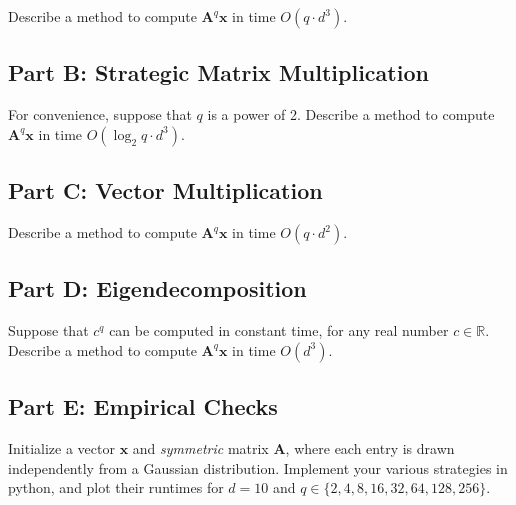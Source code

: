 \documentclass{article}
\begin{document}
Describe a method to compute $\mathbf{A}^q \mathbf{x}$ in time $O(q \cdot d^3)$.

\subsection*{Part B: Strategic Matrix Multiplication}

For convenience, suppose that $q$ is a power of 2.
Describe a method to compute $\mathbf{A}^q \mathbf{x}$ in time $O(\log_2 q \cdot d^3)$.

\subsection*{Part C: Vector Multiplication}

Describe a method to compute $\mathbf{A}^q \mathbf{x}$ in time $O(q \cdot d^2)$.

\subsection*{Part D: Eigendecomposition}

Suppose that $c^q$ can be computed in constant time, for any real number $c \in \mathbb{R}$.
Describe a method to compute $\mathbf{A}^q \mathbf{x}$ in time $O(d^3)$.

\subsection*{Part E: Empirical Checks}

Initialize a vector $\mathbf{x}$ and \textit{symmetric} matrix $\mathbf{A}$, where each entry is drawn independently from a Gaussian distribution.
Implement your various strategies in python, and plot their runtimes for $d=10$ and $q \in \{2, 4, 8, 16, 32, 64, 128, 256\}$.

%
\end{document}
